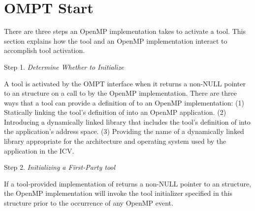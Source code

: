 \pagebreak
\section{OMPT Start}
\label{sec:ompt_start}

There are three steps an OpenMP implementation takes to activate a tool.
This section explains how the tool and an OpenMP implementation interact to accomplish tool activation.

Step 1. \emph{Determine Whether to Initialize}
\begin{adjustwidth}{2.5em}{0pt}
A tool is activated by the OMPT interface when it returns a non-NULL pointer to an  structure on a call to  by the OpenMP implementation.
There are three ways that a tool can provide a definition of  to an OpenMP implementation:
(1) Statically linking the tool's definition of  into an OpenMP application.
(2) Introducing a dynamically linked library that includes the tool's definition of
 into the application's address space.
(3) Providing the name of a dynamically linked library appropriate for the architecture
and operating system used by the application in the  ICV.
\end{adjustwidth}

Step 2. \emph{Initializing a First-Party tool}
\begin{adjustwidth}{2.5em}{0pt}
If a tool-provided implementation of  returns a non-NULL pointer
to an  structure, the OpenMP implementation will invoke
the tool initializer specified in this structure prior to the occurrence of any OpenMP event.
\end{adjustwidth}


